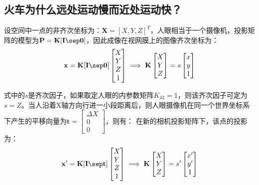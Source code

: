 \documentclass[11pt]{article}
\begin{document}
\subsection{火车为什么远处运动慢而近处运动快？}
\par
设空间中一点的非齐次坐标为：$\mathbf{X}=[X,Y,Z]^T$，人眼相当于一个摄像机，投影矩阵的模型为$\mathbf{P=K[I\sep 0]}$，因此成像在视网膜上的图像齐次坐标为：
\begin{equation*}
  \mathbf{x}=\mathbf{K[I\sep 0]}\begin{bmatrix}
    X \\Y\\Z\\1
  \end{bmatrix}\implies \mathbf{K}\begin{bmatrix}
    X \\Y\\Z
  \end{bmatrix}=s\begin{bmatrix}
    x \\y\\1
  \end{bmatrix}
\end{equation*}\par
式中的$s$是齐次因子，如果取定人眼的内参数矩阵$K_{33}=1$，则该齐次因子可定为$s={Z}$。当人沿着X轴方向行进一小段距离后，则人眼摄像机在同一个世界坐标系下产生的平移向量为$\mathbf{t}=\begin{bmatrix}
    \Delta X \\0\\0
  \end{bmatrix}$，则有：
在新的相机投影矩阵下，该点的投影为：
\begin{equation*}
  \mathbf{x}'=\mathbf{K[I\sep t]}\begin{bmatrix}
    X \\Y\\Z\\1
  \end{bmatrix}\implies \mathbf{K}\begin{bmatrix}
    X \\Y\\Z
  \end{bmatrix}=s'\begin{bmatrix}
    x' \\y'\\1
  \end{bmatrix}
\end{equation*}\par
\end{document}
